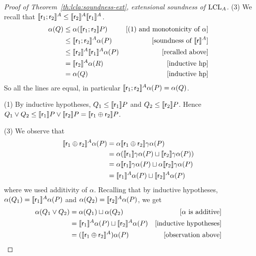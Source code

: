 \begin{proof}[Proof of Theorem~\ref{th:lcla:soundness-ext}, extensional soundness of $\text{LCL}_A$]
	\noindent (3) We recall that $\llbracket\mathsf{r}_1; \mathsf{r}_2\rrbracket^{A} \le \llbracket\mathsf{r}_2\rrbracket^{A} \llbracket\mathsf{r}_1\rrbracket^{A}$.
	\begin{align*}
		\alpha(Q) &\le \alpha(\llbracket\mathsf{r}_1; \mathsf{r}_2\rrbracket P) &[\text{(1) and monotonicity of }\alpha] \\
		&\le \llbracket\mathsf{r}_1; \mathsf{r}_2\rrbracket^{A} \alpha(P) &[\text{soundness of }\llbracket\mathsf{r}\rrbracket^{A}] \\
		&\le \llbracket\mathsf{r}_2\rrbracket^{A} \llbracket\mathsf{r}_1\rrbracket^{A} \alpha(P) &[\text{recalled above}] \\
		&= \llbracket\mathsf{r}_2\rrbracket^{A} \alpha(R) &[\text{inductive hp}] \\
		&= \alpha(Q) &[\text{inductive hp}]
	\end{align*}
	So all the lines are equal, in particular $\llbracket\mathsf{r}_1; \mathsf{r}_2\rrbracket^{A} \alpha(P) = \alpha(Q)$.
	
	\noindent (1) By inductive hypotheses, $Q_1 \le \llbracket\mathsf{r}_1\rrbracket P$ and $Q_2 \le \llbracket\mathsf{r}_2\rrbracket P$. Hence $Q_1 \lor Q_2 \le \llbracket\mathsf{r}_1\rrbracket P \lor \llbracket\mathsf{r}_2\rrbracket P = \llbracket\mathsf{r}_1 \oplus \mathsf{r}_2\rrbracket P$.
	
	\noindent (3) We observe that
	\begin{align*}
		\llbracket\mathsf{r}_1 \oplus \mathsf{r}_2\rrbracket^{A} \alpha(P) &= \alpha \llbracket\mathsf{r}_1 \oplus \mathsf{r}_2\rrbracket \gamma \alpha(P) \\
		&= \alpha (\llbracket\mathsf{r}_1\rrbracket \gamma \alpha (P) \sqcup \llbracket\mathsf{r}_2\rrbracket \gamma \alpha (P)) \\
		&= \alpha \llbracket\mathsf{r}_1\rrbracket \gamma \alpha (P) \sqcup \alpha \llbracket\mathsf{r}_2\rrbracket \gamma \alpha (P) \\
		&= \llbracket\mathsf{r}_1\rrbracket^{A}\alpha (P) \sqcup \llbracket\mathsf{r}_2\rrbracket^{A} \alpha (P)
	\end{align*}
	where we used additivity of $\alpha$. 
	Recalling that by inductive hypotheses, $\alpha(Q_1) = \llbracket\mathsf{r}_1\rrbracket^{A} \alpha(P)$ and $\alpha(Q_2) = \llbracket\mathsf{r}_2\rrbracket^{A} \alpha(P)$, we get
	\begin{align*}
		\alpha(Q_1 \lor Q_2) &= \alpha(Q_1) \sqcup \alpha(Q_2) &[\alpha\text{ is additive}] \\
		&= \llbracket\mathsf{r}_1\rrbracket^{A} \alpha(P) \sqcup \llbracket\mathsf{r}_2\rrbracket^{A} \alpha(P) &[\text{inductive hypotheses}] \\
		&= (\llbracket\mathsf{r}_1 \oplus \mathsf{r}_2\rrbracket^{A}) \alpha(P) &[\text{observation above}]
	\end{align*}
	

\end{proof}
